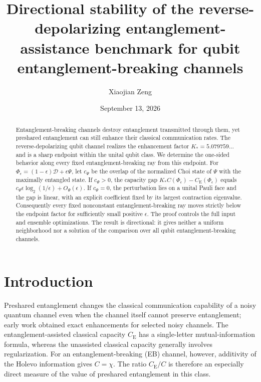 \documentclass[aip,jmp,reprint,amsmath,amssymb]{revtex4-2}
\newcommand{\eps}{\epsilon}
\newcommand{\CE}{C_{\mathrm E}}
\begin{document}
\title{Directional stability of the reverse-depolarizing entanglement-assistance benchmark for qubit entanglement-breaking channels}

\author{Xiaojian Zeng}

\date{September 13, 2026}

\begin{abstract}
Entanglement-breaking channels destroy entanglement transmitted through them, yet preshared entanglement can still enhance their classical communication rates.  The reverse-depolarizing qubit channel realizes the enhancement factor $K_*=5.079759\ldots$ and is a sharp endpoint within the unital qubit class.  We determine the one-sided behavior along every fixed entanglement-breaking ray from this endpoint.  For $\Phi_\eps=(1-\eps)\mathcal D+\eps\Psi$, let $c_\Psi$ be the overlap of the normalized Choi state of $\Psi$ with the maximally entangled state.  If $c_\Psi>0$, the capacity gap $K_*C(\Phi_\eps)-C_{\mathrm E}(\Phi_\eps)$ equals $c_\Psi\eps\log_2(1/\eps)+O_\Psi(\eps)$.  If $c_\Psi=0$, the perturbation lies on a unital Pauli face and the gap is linear, with an explicit coefficient fixed by its largest contraction eigenvalue.  Consequently every fixed nonconstant entanglement-breaking ray moves strictly below the endpoint factor for sufficiently small positive $\eps$.  The proof controls the full input and ensemble optimizations.  The result is directional: it gives neither a uniform neighborhood nor a solution of the comparison over all qubit entanglement-breaking channels.
\end{abstract}

\maketitle

\section{Introduction}

Preshared entanglement changes the classical communication capability of a noisy quantum channel even when the channel itself cannot preserve entanglement; early work obtained exact enhancements for selected noisy channels.\cite{Bennett1999}  The entanglement-assisted classical capacity $\CE$ has a single-letter mutual-information formula,\cite{Bennett2002,Holevo2002} whereas the unassisted classical capacity generally involves regularization.  For an entanglement-breaking (EB) channel, however, additivity of the Holevo information gives $C=\chi$.\cite{Shor2002}  The ratio $\CE/C$ is therefore an especially direct measure of the value of preshared entanglement in this class.
\end{document}
